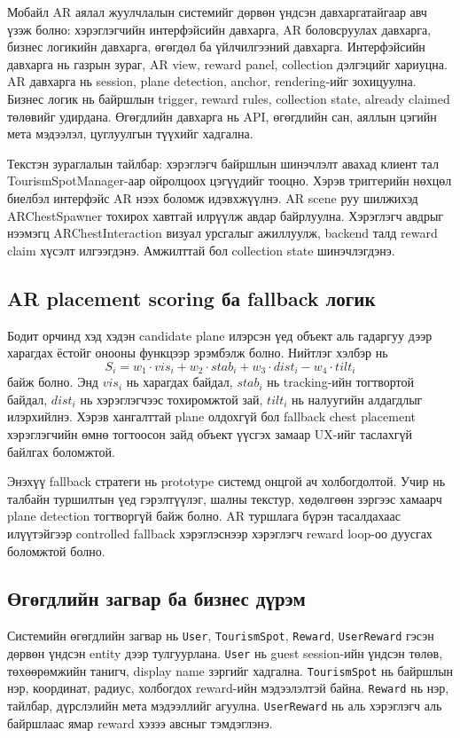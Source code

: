 \begin{sloppy}
Мобайл AR аялал жуулчлалын системийг дөрвөн үндсэн давхаргатайгаар авч үзэж болно: хэрэглэгчийн интерфэйсийн давхарга, AR боловсруулах давхарга, бизнес логикийн давхарга, өгөгдөл ба үйлчилгээний давхарга. Интерфэйсийн давхарга нь газрын зураг, AR view, reward panel, collection дэлгэцийг хариуцна. AR давхарга нь session, plane detection, anchor, rendering-ийг зохицуулна. Бизнес логик нь байршлын trigger, reward rules, collection state, already claimed төлөвийг удирдана. Өгөгдлийн давхарга нь API, өгөгдлийн сан, аяллын цэгийн мета мэдээлэл, цуглуулгын түүхийг хадгална.

Текстэн зураглалын тайлбар: хэрэглэгч байршлын шинэчлэлт авахад клиент тал TourismSpotManager-аар ойролцоох цэгүүдийг тооцно. Хэрэв триггерийн нөхцөл биелбэл интерфэйс AR нээх боломж идэвхжүүлнэ. AR scene руу шилжихэд ARChestSpawner тохирох хавтгай илрүүлж авдар байрлуулна. Хэрэглэгч авдрыг нээмэгц ARChestInteraction визуал урсгалыг ажиллуулж, backend талд reward claim хүсэлт илгээгдэнэ. Амжилттай бол collection state шинэчлэгдэнэ.

\subsection{AR placement scoring ба fallback логик}

Бодит орчинд хэд хэдэн candidate plane илэрсэн үед объект аль гадаргуу дээр харагдах ёстойг онооны функцээр эрэмбэлж болно. Нийтлэг хэлбэр нь
\[
S_i = w_1 \cdot vis_i + w_2 \cdot stab_i + w_3 \cdot dist_i - w_4 \cdot tilt_i
\]
байж болно. Энд $vis_i$ нь харагдах байдал, $stab_i$ нь tracking-ийн тогтвортой байдал, $dist_i$ нь хэрэглэгчээс тохиромжтой зай, $tilt_i$ нь налуугийн алдагдлыг илэрхийлнэ. Хэрэв хангалттай plane олдохгүй бол fallback chest placement хэрэглэгчийн өмнө тогтоосон зайд объект үүсгэх замаар UX-ийг таслахгүй байлгах боломжтой.

Энэхүү fallback стратеги нь prototype системд онцгой ач холбогдолтой. Учир нь талбайн туршилтын үед гэрэлтүүлэг, шалны текстур, хөдөлгөөн зэргээс хамаарч plane detection тогтворгүй байж болно. AR туршлага бүрэн тасалдахаас илүүтэйгээр controlled fallback хэрэглэснээр хэрэглэгч reward loop-оо дуусгах боломжтой болно.

\subsection{Өгөгдлийн загвар ба бизнес дүрэм}

Системийн өгөгдлийн загвар нь \texttt{User}, \texttt{TourismSpot}, \texttt{Reward}, \texttt{UserReward} гэсэн дөрвөн үндсэн entity дээр тулгуурлана. \texttt{User} нь guest session-ийн үндсэн төлөв, төхөөрөмжийн танигч, display name зэргийг хадгална. \texttt{TourismSpot} нь байршлын нэр, координат, радиус, холбогдох reward-ийн мэдээлэлтэй байна. \texttt{Reward} нь нэр, тайлбар, дүрслэлийн мета мэдээллийг агуулна. \texttt{UserReward} нь аль хэрэглэгч аль байршлаас ямар reward хэзээ авсныг тэмдэглэнэ.


\end{sloppy}
